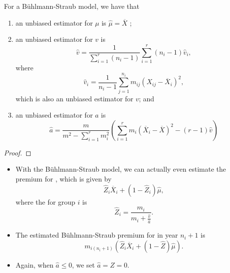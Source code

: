 \documentclass[notoc,notitlepage]{tufte-book}
\begin{document}
\begin{propo}\label{propo:non_parametric_estimation_for_buhlmann_straub_model}
  For a Bühlmann-Straub model, we have that
  \begin{enumerate}
    \item an unbiased estimator for $\mu$ is $\hat{\mu} = \overline{X}$ ;
    \item an unbiased estimator for $v$ is
      \begin{equation*}
        \hat{v} = \frac{1}{\sum_{i=1}^{r} (n_i - 1)}
          \sum_{i=1}^{r} (n_i - 1) \hat{v}_i,
      \end{equation*}
      where
      \begin{equation*}
        \hat{v}_i = \frac{1}{n_i - 1} \sum_{j=1}^{n_i}
          m_{ij} (X_{ij} - \overline{X}_i)^2,
      \end{equation*}
      which is also an unbiased estimator for $v$; and
    \item an unbiased estimator for $a$ is
      \begin{equation*}
        \hat{a} = \frac{m}{m^2 - \sum_{i=1}^{r} m_i^2} \left( 
          \sum_{i=1}^{r} m_i (\overline{X}_i - \overline{X})^2 - (r-1)\hat{v}
        \right)
      \end{equation*}
  \end{enumerate}
\end{propo}

\begin{proof}
\end{proof}

\begin{note}\label{note:estimated_buhlmann_straub_premium}
  \begin{itemize}
    \item With the Bühlmann-Straub model, we can actually even
      estimate the premium for ,
      which is given by
      \begin{equation*}
        \hat{Z}_i \overline{X}_i + (1 - \hat{Z}_i) \hat{\mu},
      \end{equation*}
      where the 
      for group $i$ is
      \begin{equation*}
        \hat{Z}_i = \frac{m_i}{m_i + \frac{\hat{v}}{\hat{a}}}.
      \end{equation*}
    \item The estimated Bühlmann-Straub premium for 
      in year $n_i + 1$ is
      \begin{equation*}
        m_{i (n_i+1)} \left(\hat{Z}_i \overline{X}_i + (1 - \hat{Z})\hat{\mu}\right).
      \end{equation*}
    \item Again, when $\hat{a} \leq 0$, we set $\hat{a} = \hat{Z} = 0$.
  \end{itemize}
\end{note}
\end{document}
